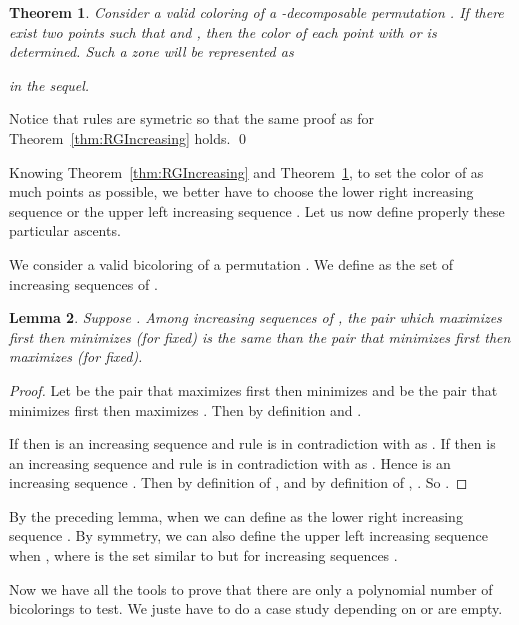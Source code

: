 \documentclass[11pt]{article}
\newenvironment{pf}{{\em \noindent Proof:}}{ \hfill \qed\smallskip}
\newcommand{\Vpoint}[2]{\draw (#1,#2) [darkgreen,fill=darkgreen] circle (3pt);}
\newcommand{\Hpoint}[2]{\draw (#1,#2) [darkred,fill=darkred] circle (3pt);}
\newcommand{\zoneGR}[3]{
\draw [very thick,H,Hpoint] (#1,#2) -- +(-#3,0);
\draw [very thick,V,Vpoint] (#1,#2) -- +(0,#3);
\draw [Vfill] (#1,#2) -- +(-#3,#3) -- +(-#3,0);
\draw [Hfill] (#1,#2) -- +(-#3,#3) -- + (0,#3);
}
\newtheorem{thm}{Theorem}[section]
\newtheorem{lem}[thm]{Lemma}
\newcommand{\ascentRG}{increasing sequence \xspace}
\newcommand{\ascentGR}{increasing sequence \xspace}
\newcommand{\ascentRR}{increasing sequence \xspace}
\newcommand{\ascentGG}{increasing sequence \xspace}
\newcommand{\ascentsRG}{increasing sequences \xspace}
\newcommand{\ascentsGR}{increasing sequences \xspace}
\begin{document}
\begin{thm}\label{thm:GRIncreasing}
Consider a valid coloring of a -decomposable permutation .
If there exist two points  such that  and ,
then the color of each point  with  or  is determined. 
Such a zone will be represented as 
 in the sequel.
\end{thm}
\begin{pf}
Notice that rules are symetric so that the same proof as for Theorem~\ref{thm:RGIncreasing} holds.
\end{pf}


Knowing Theorem~\ref{thm:RGIncreasing} and Theorem~\ref{thm:GRIncreasing}, to set the color of as much points as possible, we better have to choose the lower right \ascentRG or the upper left \ascentGR. 
Let us now define properly these particular ascents.

We consider a valid bicoloring  of a permutation .
We define  as the set of \ascentsRG of .

\begin{lem}
Suppose . 
Among \ascentsRG of , the pair  which maximizes  first then minimizes  (for  fixed) is the same than the pair that minimizes  first then maximizes  (for  fixed).
\end{lem}
\begin{proof}
Let  be the pair that maximizes  first then minimizes  and  be the pair that minimizes  first then maximizes . 
Then by definition  and .

If  then  is an \ascentGG and rule  is in contradiction with  as .
If  then  is an \ascentRR and rule  is in contradiction with  as . 
Hence  is an \ascentRG.
Then by definition of ,  and by definition of , . 
So .
\end{proof}

By the preceding lemma, when  we can define  as the lower right \ascentRG. 
By symmetry, we can also define  the upper left \ascentGR when , where  is the set similar to  but for \ascentsGR.


Now we have all the tools to prove that there are only a polynomial number of bicolorings to test. 
We juste have to do a case study depending on  or  are empty.
\end{document}
